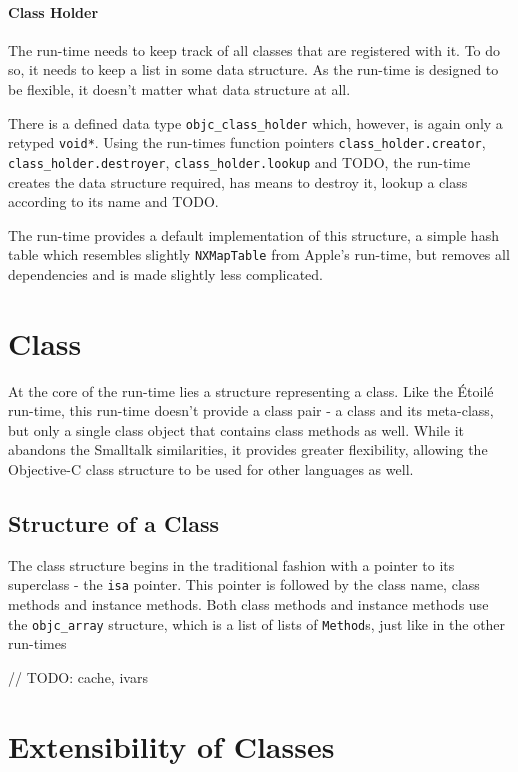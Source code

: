 \paragraph{Class Holder}

The run-time needs to keep track of all classes that are registered with it. To do so, it needs to keep a list in some data structure. As the run-time is designed to be flexible, it doesn't matter what data structure at all.

There is a defined data type \verb=objc_class_holder= which, however, is again only a retyped \verb=void*=. Using the run-times function pointers \verb=class_holder.creator=, \verb=class_holder.destroyer=, \verb=class_holder.lookup= and TODO, the run-time creates the data structure required, has means to destroy it, lookup a class according to its name and TODO.

The run-time provides a default implementation of this structure, a simple hash table which resembles slightly \verb=NXMapTable= from Apple's run-time, but removes all dependencies and is made slightly less complicated.

\section{Class}

At the core of the run-time lies a structure representing a class. Like the \'Etoil\'e run-time, this run-time doesn't provide a class pair - a class and its meta-class, but only a single class object that contains class methods as well. While it abandons the Smalltalk similarities, it provides greater flexibility, allowing the Objective-C class structure to be used for other languages as well.

\subsection{Structure of a Class}

The class structure begins in the traditional fashion with a pointer to its superclass - the \verb=isa= pointer. This pointer is followed by the class name, class methods and instance methods. Both class methods and instance methods use the \verb=objc_array= structure, which is a list of lists of \verb=Method=s, just like in the other run-times 

// TODO: cache, ivars

\section{Extensibility of Classes}

